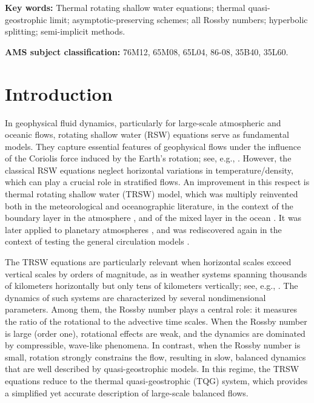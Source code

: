 \documentclass[a4paper,11pt,twoside]{article}
\numberwithin{equation}{section}
\numberwithin{figure}{section}
\numberwithin{table}{section}
\begin{document}
\smallskip
\noindent
\textbf{Key words:} Thermal rotating shallow water equations; thermal quasi-geostrophic limit; asymptotic-preserving schemes; all Rossby
numbers; hyperbolic splitting; semi-implicit methods.

\medskip
\noindent
\textbf{AMS subject classification:} 76M12, 65M08, 65L04, 86-08, 35B40, 35L60.

\section{Introduction}
In geophysical fluid dynamics, particularly for large-scale atmospheric and oceanic flows, rotating shallow water (RSW) equations serve as 
fundamental models. They capture essential features of geophysical flows under the influence of the Coriolis force induced by the Earth's 
rotation; see, e.g., \cite{Pedlosky_1987,Zeitlin_2018}. However, the classical RSW equations neglect horizontal variations in
temperature/density, which can play a crucial role in stratified flows. An improvement in this respect is thermal rotating shallow water 
(TRSW) model, which was multiply reinvented both in the meteorological and oceanographic literature, in the context of the boundary layer in
the atmosphere \cite{Lavoie_1972,Salby_1989}, and of the mixed layer in the ocean \cite{McCreary_1993,Ripa_1995,Young_1994}. It was later
applied to planetary atmospheres \cite{Cho_2008,Warneford_2014}, and was rediscovered again in the context of testing the general
circulation models \cite{Zerroukat_2015}.

The TRSW equations are particularly relevant when horizontal scales exceed vertical scales by orders of magnitude, as in weather systems 
spanning thousands of kilometers horizontally but only tens of kilometers vertically; see, e.g., \cite{Majda_2003,Zeitlin_2018}. The
dynamics of such systems are characterized by several nondimensional parameters. Among them, the Rossby number plays a central role: it
measures the ratio of the rotational to the advective time scales. When the Rossby number is large (order one), rotational effects are weak,
and the dynamics are dominated by compressible, wave-like phenomena. In contrast, when the Rossby number is small, rotation strongly
constrains the flow, resulting in slow, balanced dynamics that are well described by quasi-geostrophic models. In this regime, the TRSW
equations reduce to the thermal quasi-geostrophic (TQG) system, which provides a simplified yet accurate description of large-scale balanced
flows.
\end{document}
